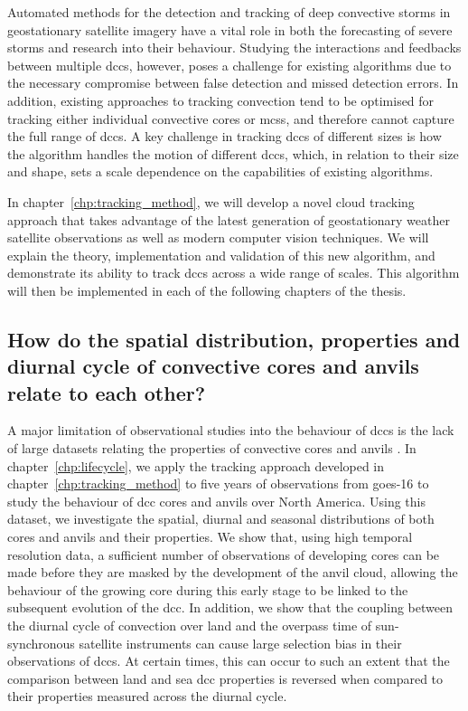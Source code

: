Automated methods for the detection and tracking of deep convective storms in geostationary satellite imagery have a vital role in both the forecasting of severe storms and research into their behaviour.
Studying the interactions and feedbacks between multiple \acrshort{dcc}s, however, poses a challenge for existing algorithms due to the necessary compromise between false detection and missed detection errors.
In addition, existing approaches to tracking convection tend to be optimised for tracking either individual convective cores or \acrshort{mcs}s, and therefore cannot capture the full range of \acrshort{dcc}s.
A key challenge in tracking \acrshort{dcc}s of different sizes is how the algorithm handles the motion of different \acrshort{dcc}s, which, in relation to their size and shape, sets a scale dependence on the capabilities of existing algorithms.

In chapter~\ref{chp:tracking_method}, we will develop a novel cloud tracking approach that takes advantage of the latest generation of geostationary weather satellite observations as well as modern computer vision techniques.
We will explain the theory, implementation and validation of this new algorithm, and demonstrate its ability to track \acrshort{dcc}s across a wide range of scales.
This algorithm will then be implemented in each of the following chapters of the thesis.

\subsection{How do the spatial distribution, properties and diurnal cycle of convective cores and anvils relate to each other?}

A major limitation of observational studies into the behaviour of \acrshort{dcc}s is the lack of large datasets relating the properties of convective cores and anvils \citep{gasparini_opinion_2023}.
In chapter~\ref{chp:lifecycle}, we apply the tracking approach developed in chapter~\ref{chp:tracking_method} to five years of observations from \acrshort{goes}-16 to study the behaviour of \acrshort{dcc} cores and anvils over North America. 
Using this dataset, we investigate the spatial, diurnal and seasonal distributions of both cores and anvils and their properties. 
We show that, using high temporal resolution data, a sufficient number of observations of developing cores can be made before they are masked by the development of the anvil cloud, allowing the behaviour of the growing core during this early stage to be linked to the subsequent evolution of the \acrshort{dcc}.
In addition, we show that the coupling between the diurnal cycle of convection over land and the overpass time of sun-synchronous satellite instruments can cause large selection bias in their observations of \acrshort{dcc}s. 
At certain times, this can occur to such an extent that the comparison between land and sea \acrshort{dcc} properties is reversed when compared to their properties measured across the diurnal cycle.

